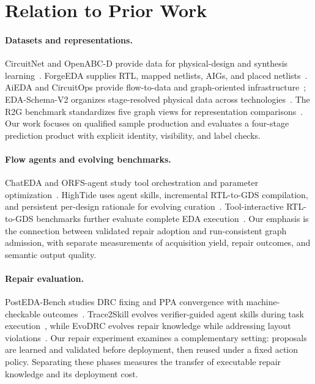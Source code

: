 \section{Relation to Prior Work}
\label{sec:related}

\paragraph{Datasets and representations.}
CircuitNet and OpenABC-D provide data for physical-design and synthesis
learning~\cite{chai2022circuitnet,chowdhury2021openabcd}. ForgeEDA supplies RTL, mapped netlists,
AIGs, and placed netlists~\cite{shi2025forgeeda}. AiEDA and CircuitOps provide flow-to-data and
graph-oriented infrastructure~\cite{qiu2025aieda,liang2023circuitops}; EDA-Schema-V2 organizes
stage-resolved physical data across technologies~\cite{shrestha2026edaschema}. The R2G benchmark
standardizes five graph views for representation comparisons~\cite{zhou2026r2g}. Our work focuses on
qualified sample production and evaluates a four-stage prediction product with explicit identity,
visibility, and label checks.

\paragraph{Flow agents and evolving benchmarks.}
ChatEDA and ORFS-agent study tool orchestration and parameter
optimization~\cite{he2024chateda,ghose2026orfsagent}. HighTide uses agent skills, incremental
RTL-to-GDS compilation, and persistent per-design rationale for evolving
curation~\cite{goldblatt2026hightide}. Tool-interactive RTL-to-GDS benchmarks further evaluate complete
EDA execution~\cite{deng2026rtlgds}. Our emphasis is the connection between validated repair adoption
and run-consistent graph admission, with separate measurements of acquisition yield, repair outcomes,
and semantic output quality.

\paragraph{Repair evaluation.}
PostEDA-Bench studies DRC fixing and PPA convergence with machine-checkable
outcomes~\cite{liu2026postedabench}. Trace2Skill evolves verifier-guided agent skills during task
execution~\cite{du2026trace2skill}, while EvoDRC evolves repair knowledge while addressing layout
violations~\cite{wu2026evodrc}. Our repair experiment examines a complementary setting: proposals are
learned and validated before deployment, then reused under a fixed action policy. Separating these
phases measures the transfer of executable repair knowledge and its deployment cost.
